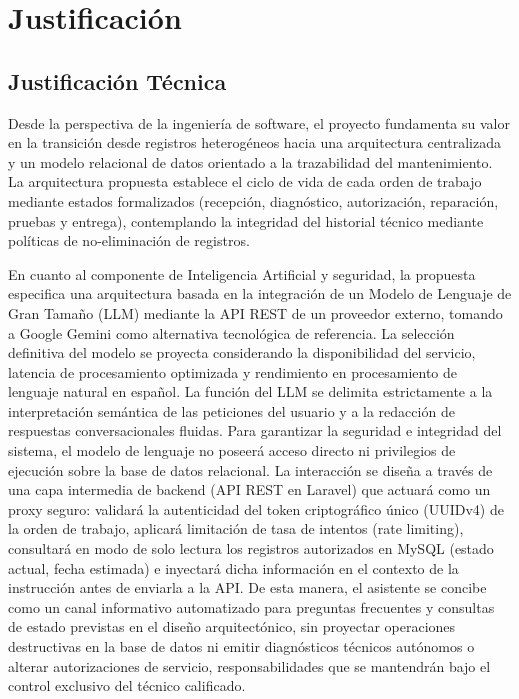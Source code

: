 \section{Justificación}

\subsection{Justificación Técnica}

Desde la perspectiva de la ingeniería de software, el proyecto fundamenta su valor en la transición desde registros heterogéneos hacia una arquitectura centralizada y un modelo relacional de datos orientado a la trazabilidad del mantenimiento. La arquitectura propuesta establece el ciclo de vida de cada orden de trabajo mediante estados formalizados (recepción, diagnóstico, autorización, reparación, pruebas y entrega), contemplando la integridad del historial técnico mediante políticas de no-eliminación de registros.

En cuanto al componente de Inteligencia Artificial y seguridad, la propuesta especifica una arquitectura basada en la integración de un Modelo de Lenguaje de Gran Tamaño (LLM) mediante la API REST de un proveedor externo, tomando a Google Gemini \cite{googleai2026} como alternativa tecnológica de referencia. La selección definitiva del modelo se proyecta considerando la disponibilidad del servicio, latencia de procesamiento optimizada y rendimiento en procesamiento de lenguaje natural en español. La función del LLM se delimita estrictamente a la interpretación semántica de las peticiones del usuario y a la redacción de respuestas conversacionales fluidas. Para garantizar la seguridad e integridad del sistema, el modelo de lenguaje no poseerá acceso directo ni privilegios de ejecución sobre la base de datos relacional. La interacción se diseña a través de una capa intermedia de backend (API REST en Laravel) que actuará como un proxy seguro: validará la autenticidad del token criptográfico único (UUIDv4) de la orden de trabajo, aplicará limitación de tasa de intentos (rate limiting), consultará en modo de solo lectura los registros autorizados en MySQL (estado actual, fecha estimada) e inyectará dicha información en el contexto de la instrucción antes de enviarla a la API. De esta manera, el asistente se concibe como un canal informativo automatizado para preguntas frecuentes y consultas de estado previstas en el diseño arquitectónico, sin proyectar operaciones destructivas en la base de datos ni emitir diagnósticos técnicos autónomos o alterar autorizaciones de servicio, responsabilidades que se mantendrán bajo el control exclusivo del técnico calificado.

